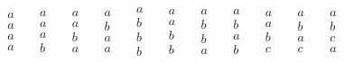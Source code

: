 \documentclass[10pt,]{book}
\theoremstyle{plain}
\theoremstyle{definition}
\theoremstyle{definition}
\numberwithin{equation}{chapter}
\begin{document}
\begin{equation*}
\begin{matrix} a \\ a \\ a \\ a \end{matrix} \quad ~
\begin{matrix} a \\ a \\ a \\ b \end{matrix} \quad ~
\begin{matrix} a \\ a \\ b \\ a \end{matrix} \quad ~
\begin{matrix} a \\ b \\ a \\ a \end{matrix} \quad ~
\begin{matrix} a \\ b \\ b \\ b \end{matrix} \quad ~
\begin{matrix} a \\ a \\ b \\ b \end{matrix} \quad ~
\begin{matrix} a \\ b \\ b \\ a \end{matrix} \quad ~
\begin{matrix} a \\ b \\ a \\ b \end{matrix} \quad ~
\begin{matrix} a \\ a \\ b \\ c \end{matrix} \quad ~
\begin{matrix} a \\ b \\ a \\ c \end{matrix} \quad ~
\begin{matrix} a \\ b \\ c \\ a \end{matrix} \quad ~

\end{equation*}
\end{document}
